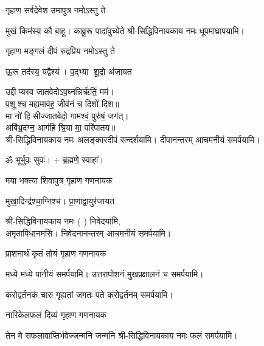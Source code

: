 \begin{center}
\begingroup
\setlength{\columnseprule}{1pt}
\let\chapt\sect


\endgroup

{गृहाण सर्वदेवेश उमापुत्र नमोऽस्तु ते} 

{मुखं॒ किम॑स्य॒ कौ बा॒हू। कावू॒रू पादा॑वुच्येते}
श्री-सिद्धिविनायकाय नमः धूपमाघ्रापयामि।\medskip

{गृहाण मङ्गलं दीपं रुद्रप्रिय नमोऽस्तु ते}

{ऊ॒रू तद॑स्य॒ यद्वैश्य॑। प॒द्भ्या शू॒द्रो अ॑जायत}

उद्दीप्यस्व जातवेदोऽप॒घ्नन्निर्ऋ॑तिं॒ मम॑।\\
प॒शूश्च॒ मह्य॒माव॑ह॒ जीव॑नं च॒ दिशो॑ दिश॥ \\
मा नो॑ हिसीज्जातवेदो॒ गामश्वं॒ पुरु॑षं॒ जग॑त्।\\
अबि॑भ्र॒दग्न॒ आग॑हि श्रि॒या मा॒ परि॑पातय॥ \\

श्री-सिद्धिविनायकाय नमः अलङ्कारदीपं सन्दर्शयामि। दीपानन्तरम् आचमनीयं समर्पयामि।\medskip

ॐ भूर्भुवः॒ सुवः॑। + ब्र॒ह्मणे॒ स्वाहा᳚।

{मया भक्त्या शिवापुत्र गृहाण गणनायक}

{मुखा॒दिन्द्र॑श्चा॒ग्निश्च॑। प्रा॒णाद्वा॒युर॑जायत}

श्री-सिद्धिविनायकाय नमः (	) निवेदयामि, \\
अमृतापिधानमसि। निवेदनानन्तरम् आचमनीयं समर्पयामि।\medskip

{प्राशनार्थं कृतं तोयं गृहाण गणनायक}

मध्ये मध्ये पानीयं समर्पयामि।  उत्तरापोशनं मुखप्रक्षालनं च समर्पयामि।\medskip

{करोद्वर्तनकं चारु गृह्यतां जगतः पते} 
करोद्वर्तनम् समर्पयामि।

{नारिकेलफलं दिव्यं गृहाण गणनायक} 

{तेन मे सफलावाप्तिर्भवेज्जन्मनि जन्मनि}
श्री-सिद्धिविनायकाय नमः फलं समर्पयामि।\medskip
  

\end{center}
